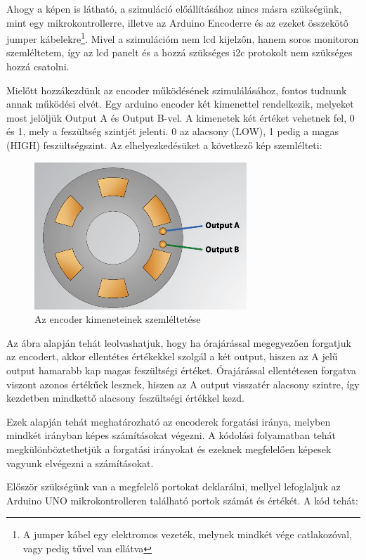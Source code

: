 \documentclass[
]{thesis-ekf}
\theoremstyle{definition}
\theoremstyle{remark}
\begin{document}
			\par Ahogy a képen is látható, a szimuláció előállításához nincs másra szükségünk, mint egy mikrokontrollerre, illetve az Arduino Encoderre és az ezeket összekötő jumper kábelekre\footnote{A jumper kábel egy elektromos vezeték, melynek mindkét vége catlakozóval, vagy pedig tűvel van ellátva}. Mivel a szimulációm nem lcd kijelzőn, hanem soros monitoron szemléltetem, így az lcd panelt és a hozzá szükséges i2c protokolt nem szükséges hozzá csatolni.
			\par Mielőtt hozzákezdünk az encoder működésének szimulálásához, fontos tudnunk annak működési elvét. Egy arduino encoder két kimenettel rendelkezik, melyeket most jelöljük Output A és Output B-vel.
			A kimenetek két értéket vehetnek fel, 0 és 1, mely a feszültség szintjét jelenti. 0 az alacsony (LOW), 1 pedig a magas (HIGH) feszültségszint. Az elhelyezkedésüket a következő kép szemlélteti:
			\begin{figure}[H]
				\centering
				\includegraphics[scale=0.55]{./images/encoderoutput}
				\caption{Az encoder kimeneteinek szemléltetése}
			\end{figure}
			\par Az ábra alapján tehát leolvashatjuk, hogy ha órajárással megegyezően forgatjuk az encodert, akkor ellentétes értékekkel szolgál a két output, hiszen az A jelű output hamarabb kap magas feszültségi értéket. Órajárással ellentétesen forgatva viszont azonos értékűek lesznek, hiszen az A output visszatér alacsony szintre, így kezdetben mindkettő alacsony feszültségi értékkel kezd. 
			\par Ezek alapján tehát meghatározható az encoderek forgatási iránya, melyben mindkét irányban képes számításokat végezni. A kódolási folyamatban tehát megkülönböztethetjük a forgatási irányokat és ezeknek megfelelően képesek vagyunk elvégezni a számításokat.
			\par Először szükségünk van a megfelelő portokat deklarálni, mellyel lefoglaljuk az Arduino UNO mikrokontrolleren található portok számát és értékét. A kód tehát:
\end{document}
